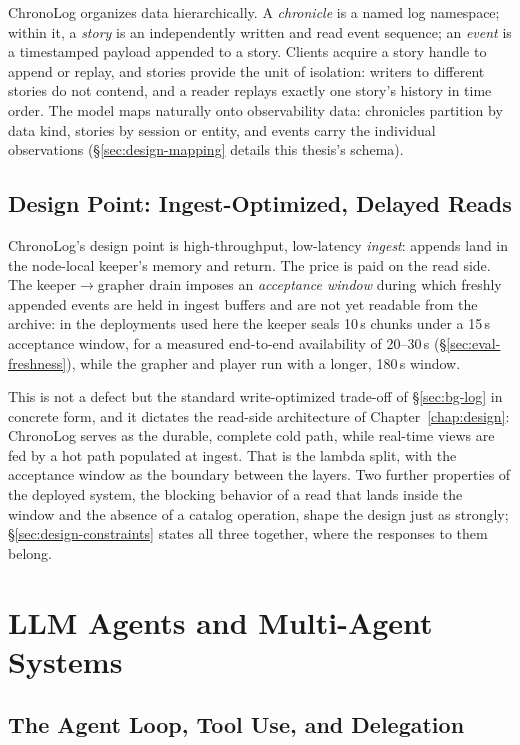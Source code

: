 ChronoLog organizes data hierarchically. A \emph{chronicle} is a named log
namespace; within it, a \emph{story} is an independently written and read
event sequence; an \emph{event} is a timestamped payload appended to a story.
Clients acquire a story handle to append or replay, and stories provide the
unit of isolation: writers to different stories do not contend, and a reader
replays exactly one story's history in time order. The model maps naturally
onto observability data: chronicles partition by data kind, stories by
session or entity, and events carry the individual observations
(\S\ref{sec:design-mapping} details this thesis's schema).

\subsection{Design Point: Ingest-Optimized, Delayed Reads}
\label{sec:bg-chronolog-design}

ChronoLog's design point is high-throughput, low-latency \emph{ingest}:
appends land in the node-local keeper's memory and return. The price is paid
on the read side. The keeper$\to$grapher drain imposes an \emph{acceptance
window} during which freshly appended events are held in ingest buffers and
are not yet readable from the archive: in the deployments used here the
keeper seals 10\,s chunks under a 15\,s acceptance window, for a measured
end-to-end availability of 20--30\,s (\S\ref{sec:eval-freshness}), while the
grapher and player run with a longer, 180\,s window.

This is not a defect but the standard write-optimized trade-off of
\S\ref{sec:bg-log} in concrete form, and it dictates the read-side
architecture of Chapter~\ref{chap:design}: ChronoLog serves as the durable,
complete cold path, while real-time views are fed by a hot path populated at
ingest. That is the lambda split, with the acceptance window as the boundary
between the layers. Two further properties of the deployed system, the
blocking behavior of a read that lands inside the window and the absence of
a catalog operation, shape the design just as strongly;
\S\ref{sec:design-constraints} states all three together, where the
responses to them belong.

\section{LLM Agents and Multi-Agent Systems}
\label{sec:bg-agents}

\subsection{The Agent Loop, Tool Use, and Delegation}
\label{sec:bg-agent-loop}

